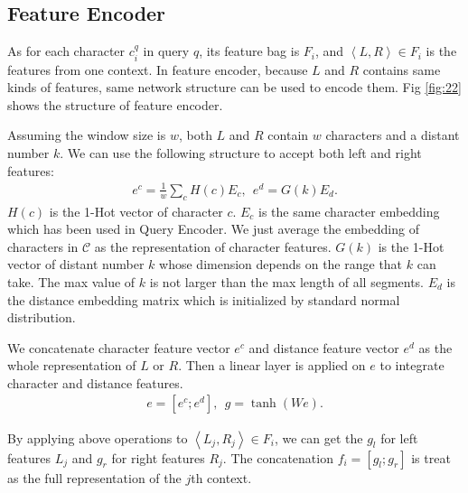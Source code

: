 \subsection{Feature Encoder}

As for each character $c_i^q$ in query $q$, its feature bag is $F_i$, and $\left \langle L, R \right \rangle \in F_i$ is the features from one context. In feature encoder, because $L$ and $R$ contains same kinds of features, same network structure can be used to encode them. Fig \ref{fig:22} shows the structure of feature encoder.


Assuming the window size is $w$, both $L$ and $R$ contain $w$ characters and a distant number $k$. We can use the following structure to accept both left and right features:
\begin{align*}
	e^c = \frac{1} {w} \sum_{c} {H(c)E_c}, \ \ e^d = G(k)E_d.
\end{align*}
$H(c)$ is the 1-Hot vector of character $c$. $E_c$ is the same character embedding which has been used in Query Encoder. We just average the embedding of characters in $\mathcal{C}$ as the representation of character features. $G(k)$ is the 1-Hot vector of distant number $k$ whose dimension depends on the range that $k$ can take. The max value of $k$ is not larger than the max length of all segments. $E_d$ is the distance embedding matrix which is initialized by standard normal distribution.

We concatenate character feature vector $e^c$ and distance feature vector $e^d$ as the whole representation of $L$ or $R$. Then a linear layer is applied on $e$ to integrate character and distance features.
\begin{align*}
	e = [e^c; e^d], \ \ g = \tanh(We).
\end{align*}

By applying above operations to $\left \langle L_j, R_j \right \rangle \in F_i$, we can get the $g_l$ for left features $L_j$ and $g_r$ for right features $R_j$. The concatenation $f_i = [g_l; g_r]$ is treat as the full representation of the $j$th context.

